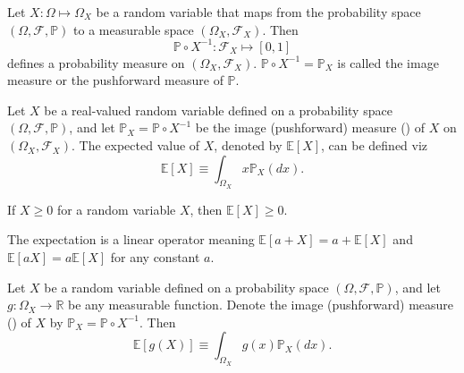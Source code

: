 \begin{definition}
	\label{def:image_measure}
	Let $X: \Omega \mapsto \Omega_X$ be a random variable that maps from the probability space $(\Omega, \mathcal{F}, \mathbb{P})$ to a measurable space $(\Omega_X, \mathcal{F}_X)$. Then~\cite{drewitz2019introduction}
	\begin{equation}
		\mathbb{P}\circ X^{-1}: \mathcal{F}_X\mapsto [0,1]
	\end{equation}
	defines a probability measure on $(\Omega_X, \mathcal{F}_X)$. $\mathbb{P}\circ X^{-1} = \mathbb{P}_X$ is called the image measure or the pushforward measure of $\mathbb{P}$.
\end{definition}

\begin{definition}
	\label{def:expectation_image}
	Let $X$ be a real-valued random variable defined on a probability space $(\Omega, \mathcal{F},\mathbb{P})$, and let $\mathbb{P}_X = \mathbb{P} \circ X^{-1}$ be the image (pushforward) measure () of $X$ on $(\Omega_X, \mathcal{F}_X)$. The expected value of $X$, denoted by $\mathbb{E}[X]$, can be defined viz
	\begin{equation}
		\mathbb{E}[X] \equiv \int_{\Omega_X} x \mathbb{P}_X(dx).
		\label{eq:expected_value_image}
	\end{equation}
\end{definition}

\begin{theorem}
	If $X\geq 0$ for a random variable $X$, then $\mathbb{E}[X]\geq 0$.
\end{theorem}
\begin{theorem}
	\label{theorem:exp_linear}
	The expectation is a linear operator meaning $\mathbb{E}[a+X] = a+\mathbb{E}[X]$ and $\mathbb{E}[aX] = a\mathbb{E}[X]$ for any constant $a$.
\end{theorem}
\begin{theorem}
	\label{th:lotus}
	Let $X$ be a random variable defined on a probability space $(\Omega, \mathcal{F}, \mathbb{P})$, and let $g: \Omega_X \to \mathbb{R}$ be any measurable function. Denote the image (pushforward) measure () of $X$ by $\mathbb{P}_X = \mathbb{P} \circ X^{-1}$. Then
	\begin{equation}
		\mathbb{E}[g(X)] \equiv \int_{\Omega_X} g(x) \mathbb{P}_X(dx).
		\label{eq:lotus_image}
	\end{equation}
\end{theorem}

